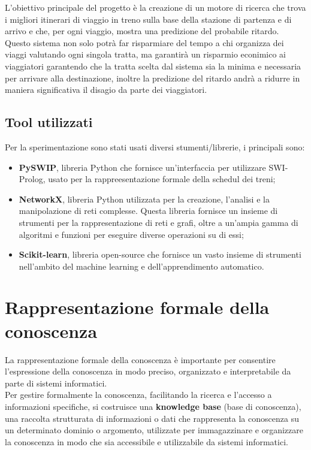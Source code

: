 \documentclass[italian,12pt,a4paper]{article}
\begin{document}
	L'obiettivo principale del progetto è la creazione di un motore di ricerca che trova i migliori itinerari di viaggio in treno sulla base della stazione di partenza e di arrivo e che, per ogni viaggio, mostra una predizione del probabile ritardo.\\
	Questo sistema non solo potrà far risparmiare del tempo a chi organizza dei viaggi valutando ogni singola tratta, ma garantirà un risparmio econimico ai viaggiatori garantendo che la tratta scelta dal sistema sia la minima e necessaria per arrivare alla destinazione, inoltre la predizione del ritardo andrà a ridurre in maniera significativa il disagio da parte dei viaggiatori. 
	
	
	\subsection{Tool utilizzati}
	Per la sperimentazione sono stati usati diversi stumenti/librerie, i principali sono:
	
		\begin{itemize}
			\item \textbf{PySWIP}, libreria Python che fornisce un'interfaccia per utilizzare SWI-Prolog, usato per la rappreesentazione formale della schedul dei treni;
			\item \textbf{NetworkX}, libreria Python utilizzata per la creazione, l'analisi e la manipolazione di reti complesse. Questa libreria fornisce un insieme di strumenti per la rappresentazione di reti e grafi, oltre a un'ampia gamma di algoritmi e funzioni per eseguire diverse operazioni su di essi;
			\item \textbf{Scikit-learn}, libreria open-source che fornisce un vasto insieme di strumenti nell'ambito del machine learning e dell'apprendimento automatico.
		\end{itemize}

	\section{Rappresentazione formale della conoscenza}
	
	La rappresentazione formale della conoscenza è importante per consentire l'espressione della conoscenza in modo preciso, organizzato e interpretabile da parte di sistemi informatici.\\
	Per gestire formalmente la conoscenza, facilitando la ricerca e l'accesso a informazioni specifiche, si costruisce una \textbf{knowledge base} (base di conoscenza), una raccolta strutturata di informazioni o dati che rappresenta la conoscenza su un determinato dominio o argomento, utilizzate per immagazzinare e organizzare la conoscenza in modo che sia accessibile e utilizzabile da sistemi informatici.
	
\end{document}
